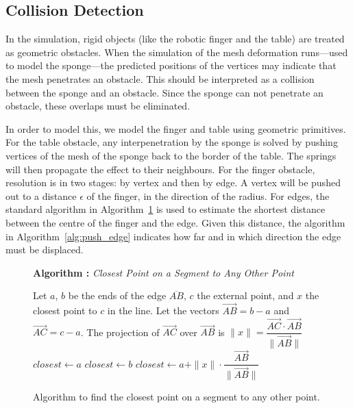 \documentclass[journal]{IEEEtran}
\newcommand{\alref}[1]{Algorithm~\ref{#1}}
\newcounter{algorithm}
\newenvironment{algorithmicieee}[1]
  {\refstepcounter{algorithm}
   \begin{lrbox}{\ieeealgbox}
   \begin{minipage}{\dimexpr\columnwidth-2\fboxsep-2\fboxrule}
   \textbf{Algorithm \arabic{algorithm}:} \textit{#1} \par
   \begin{algorithmic}[1]}
  {\end{algorithmic}
   \end{minipage}
   \end{lrbox}\noindent\fbox{\usebox{\ieeealgbox}}}
\newcommand{\comment}[1]{{\color{red} #1}}
\begin{document}
\subsection{Collision Detection}
In the simulation, rigid objects \comment{(like the robotic finger and the table)} are treated as geometric obstacles.  \comment{When the simulation of the mesh deformation runs---used to model the sponge---the predicted positions of the vertices may indicate that the mesh penetrates an obstacle.  This should be interpreted as a collision between the sponge and an obstacle.  Since the sponge can not penetrate an obstacle, these overlaps must be eliminated. %
}

\comment{In order to model this, we model the finger and table using geometric primitives.  For the table obstacle, any interpenetration by the sponge is solved by pushing vertices of the mesh of the sponge back to the border of the table.  The springs will then propagate the effect to their neighbours.  For the finger obstacle, resolution is in two stages: by vertex and then by edge.}  A vertex will be pushed out to a distance $\epsilon$ of the finger, in the direction of the radius.  For edges, the \comment{standard} algorithm in \alref{alg:point_segment} is used to estimate the shortest distance between the centre of the finger and the edge.  Given this distance, the algorithm in \alref{alg:push_edge} indicates how far and in which direction the edge must be displaced.

\begin{figure}
  \begin{algorithmicieee}{Closest Point on a Segment to Any Other Point}\label{alg:point_segment}
 \STATE Let $a$, $b$ be the ends of the edge $\overline{AB}$, $c$ the external point, and $x$ the closest point to $c$ in the line.
 \STATE Let the vectors $\vec{AB} = b - a$ and $\vec{AC} = c - a$.
 \STATE The projection of $\vec{AC}$ over $\vec{AB}$ is $\|x\| = \dfrac{\vec{AC} \cdot \vec{AB}}{\|\vec{AB}\|}$
  \STATE $closest \gets a$
 \ELSE
   \STATE $closest \gets b$
  \ELSE
   \STATE $closest \gets a + \|x\| \cdot \dfrac{\vec{AB}}{\|\vec{AB}\|}$
  \ENDIF
 \ENDIF
 \end{algorithmicieee}
 \caption{Algorithm to find the closest point on a segment to any other point.}
\end{figure}
\end{document}
